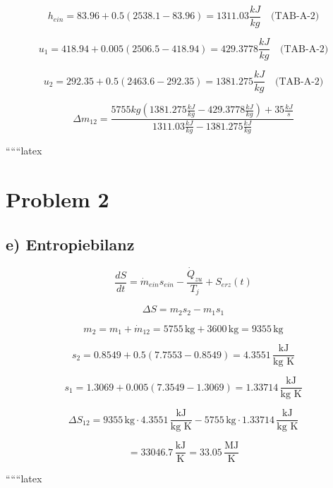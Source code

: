 \begin{equation*}
h_{ein} = 83.96 + 0.5 (2538.1 - 83.96) = 1311.03 \frac{kJ}{kg} \quad \text{(TAB-A-2)}
\end{equation*}

\begin{equation*}
u_1 = 418.94 + 0.005 (2506.5 - 418.94) = 429.3778 \frac{kJ}{kg} \quad \text{(TAB-A-2)}
\end{equation*}

\begin{equation*}
u_2 = 292.35 + 0.5 (2463.6 - 292.35) = 1381.275 \frac{kJ}{kg} \quad \text{(TAB-A-2)}
\end{equation*}

\begin{equation*}
\Delta m_{12} = \frac{5755 kg (1381.275 \frac{kJ}{kg} - 429.3778 \frac{kJ}{kg}) + 35 \frac{kJ}{s}}{1311.03 \frac{kJ}{kg} - 1381.275 \frac{kJ}{kg}}
\end{equation*}

``````latex


\section*{Problem 2}

\subsection*{e) Entropiebilanz}

\[
\frac{dS}{dt} = \dot{m}_{ein} s_{ein} - \frac{\dot{Q}_{zu}}{T_j} + S_{erz}(t)
\]

\[
\Delta S = m_2 s_2 - m_1 s_1
\]

\[
m_2 = m_1 + \dot{m}_{12} = 5755 \, \text{kg} + 3600 \, \text{kg} = 9355 \, \text{kg}
\]

\[
s_2 = 0.8549 + 0.5 (7.7553 - 0.8549) = 4.3551 \, \frac{\text{kJ}}{\text{kg K}}
\]

\[
s_1 = 1.3069 + 0.005 (7.3549 - 1.3069) = 1.33714 \, \frac{\text{kJ}}{\text{kg K}}
\]

\[
\Delta S_{12} = 9355 \, \text{kg} \cdot 4.3551 \, \frac{\text{kJ}}{\text{kg K}} - 5755 \, \text{kg} \cdot 1.33714 \, \frac{\text{kJ}}{\text{kg K}}
\]

\[
= 33046.7 \, \frac{\text{kJ}}{\text{K}} = 33.05 \, \frac{\text{MJ}}{\text{K}}
\]

``````latex


